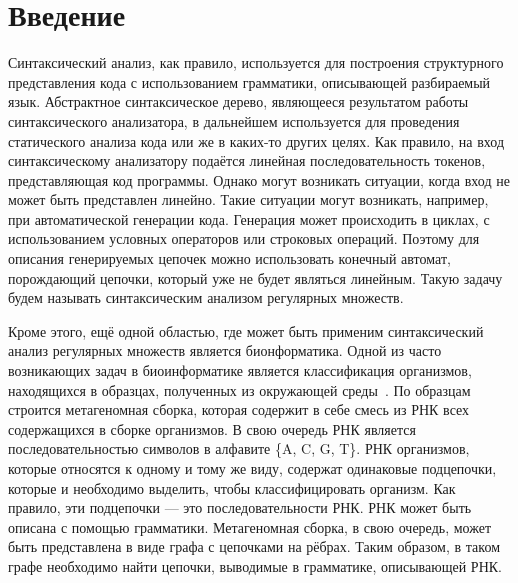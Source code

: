 \section*{Введение}

Синтаксический анализ, как правило, используется для построения структурного представления кода с использованием грамматики, описывающей разбираемый язык. Абстрактное синтаксическое дерево, являющееся результатом работы синтаксического анализатора, в дальнейшем используется для проведения статического анализа кода или же в каких-то других целях. Как правило, на вход синтаксическому анализатору подаётся линейная последовательность токенов, представляющая код программы. Однако могут возникать ситуации, когда вход не может быть представлен линейно. Такие ситуации могут возникать, например, при автоматической генерации кода. Генерация может происходить в циклах, с использованием условных операторов или строковых операций. Поэтому для описания генерируемых цепочек можно использовать конечный автомат, порождающий цепочки, который уже не будет являться линейным. Такую задачу будем называть синтаксическим анализом регулярных множеств.

Кроме этого, ещё одной областью, где может быть применим синтаксический анализ регулярных множеств является бионформатика. Одной из часто возникающих задач в биоинформатике является классификация организмов, находящихся в образцах, полученных из окружающей среды~\cite{bioRNA}. По образцам строится метагеномная сборка, которая содержит в себе смесь из РНК всех содержащихся в сборке организмов. В свою очередь РНК является последовательностью символов в алфавите \{A, C, G, T\}. РНК организмов, которые относятся к одному и тому же виду, содержат одинаковые подцепочки, которые и необходимо выделить, чтобы классифицировать организм. Как правило, эти подцепочки --- это последовательности РНК. РНК может быть описана с помощью грамматики. Метагеномная сборка, в свою очередь, может быть представлена в виде графа с цепочками на рёбрах. Таким образом, в таком графе необходимо найти цепочки, выводимые в грамматике, описывающей РНК. 

